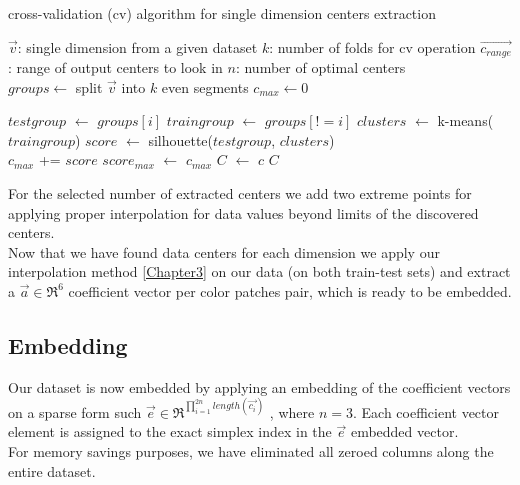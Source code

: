 \begin{algorithm}[H]
	\caption{cross-validation (cv) algorithm for single dimension centers extraction}
	\begin{algorithmic}		
		
		\REQUIRE $\overrightarrow{v}$: single dimension from a given dataset 
		\REQUIRE $k$: number of folds for cv operation
		\REQUIRE $\overrightarrow{c_{range}}$: range of output centers to look in
		\ENSURE $n$: number of optimal centers\\
		\STATE $groups \leftarrow$ split $\overrightarrow{v}$ into $k$ even segments
		\STATE $c_{max} \leftarrow 0$  
		
		\STATE $test group$ $\leftarrow$ $groups[i]$
		\STATE $train group$ $\leftarrow$ $groups[!=i]$		
		\STATE $clusters$ $\leftarrow$ k-means($train group$)
		\STATE $score$ $\leftarrow$ silhouette($test group$, $clusters$)\\
		\STATE $c_{max}$ += $score$
		\ENDFOR
			\STATE $score_{max}$ $\leftarrow$ $c_{max}$
			\STATE $C$ $\leftarrow$ $c$
			\ENDIF
		\ENDFOR	
		\RETURN $C$	
		
	\end{algorithmic}
	\label{cross_validation}
\end{algorithm}	


For the selected number of extracted centers we add two extreme points for applying proper interpolation for data values beyond limits of the discovered centers.
\\
Now that we have found data centers for each dimension we apply our interpolation method \ref{Chapter3} on our data (on both train-test sets) and extract a $\overrightarrow{a} \in \Re^6$ coefficient vector per color patches pair, which is ready to be embedded.


\subsection{Embedding}
Our dataset is now embedded by applying an embedding of the coefficient vectors on a sparse form such $\overrightarrow{e} \in \Re^{\prod_{i=1}^{2n}{length(\overrightarrow{c_i})}}$ , where $n = 3$.
Each coefficient vector element is assigned to the exact simplex index in the $\overrightarrow{e}$ embedded vector.
\\
For memory savings purposes, we have eliminated all zeroed columns along the entire dataset.

